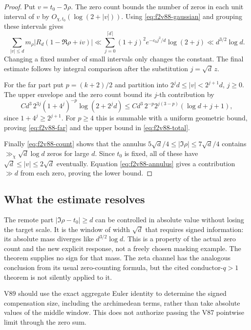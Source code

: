 \documentclass[11pt]{article}
\theoremstyle{definition}
\theoremstyle{remark}
\begin{document}
\begin{proof}
Put \(v=t_0-\Im\rho\).  The zero count bounds the number of zeros in
each unit interval of \(v\) by \(O_{\chi,t_0}(\log(2+|v|))\).
Using \eqref{eq:f2v88-gaussian} and grouping these intervals gives
\[
 \sum_{|v|\le d}m_\rho|R_d(1-\Re\rho+iv)|
 \ll\sum_{j=0}^{\lceil d\rceil}
       (1+j)^2 e^{-c_0j^2/d}\log(2+j)
 \ll d^{3/2}\log d.
\]
Changing a fixed number of small intervals only changes the constant.
The final estimate follows by integral comparison after the substitution
\(j=\sqrt d\,z\).

For the far part put \(p=(k+2)/2\) and partition into
\(2^jd\le |v|<2^{j+1}d\), \(j\ge0\).  The upper envelope and the
zero count bound its \(j\)-th contribution by
\[
 C d^3\,2^{3j}(1+4^j)^{-p}\log(2+2^jd)
 \le C d^3\,2^{-p}2^{j(3-p)}(\log d+j+1),
\]
since \(1+4^j\ge2^{j+1}\).  For \(p\ge4\) this is summable with
a uniform geometric bound, proving \eqref{eq:f2v88-far} and the upper
bound in \eqref{eq:f2v88-total}.

Finally \eqref{eq:f2v88-count} shows that the annulus
\(5\sqrt d/4\le|\Im\rho|\le7\sqrt d/4\) contains
\(\gg_\chi\sqrt d\log d\) zeros for large \(d\).  Since \(t_0\)
is fixed, all of these have \(\sqrt d\le|v|\le2\sqrt d\)
eventually.  Equation \eqref{eq:f2v88-annulus} gives a contribution
\(\gg d\) from each zero, proving the lower bound.
\end{proof}

\subsection*{What the estimate resolves}

The remote part \(|\Im\rho-t_0|\ge d\) can be controlled in absolute
value without losing the target scale.  It is the window of width
\(\sqrt d\) that requires signed information: its absolute mass
diverges like \(d^{3/2}\log d\).  This is a property of the actual
zero count and the new explicit response, not a freely chosen masking
example.  The theorem supplies no sign for that mass.  The zeta channel
has the analogous conclusion from its usual zero-counting formula, but
the cited conductor-\(q>1\) theorem is not silently applied to it.

V89 should use the exact aggregate Euler identity to determine the signed
compensation size, including the archimedean terms, rather than take
absolute values of the middle window.  This does not authorize passing
the V87 pointwise limit through the zero sum.
\end{document}
